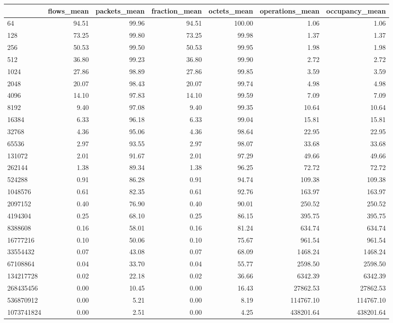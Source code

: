 \begin{tabular}{lrrrrrr}
\toprule
 & flows_mean & packets_mean & fraction_mean & octets_mean & operations_mean & occupancy_mean \\
\midrule
64 & 94.51 & 99.96 & 94.51 & 100.00 & 1.06 & 1.06 \\
128 & 73.25 & 99.80 & 73.25 & 99.98 & 1.37 & 1.37 \\
256 & 50.53 & 99.50 & 50.53 & 99.95 & 1.98 & 1.98 \\
512 & 36.80 & 99.23 & 36.80 & 99.90 & 2.72 & 2.72 \\
1024 & 27.86 & 98.89 & 27.86 & 99.85 & 3.59 & 3.59 \\
2048 & 20.07 & 98.43 & 20.07 & 99.74 & 4.98 & 4.98 \\
4096 & 14.10 & 97.83 & 14.10 & 99.59 & 7.09 & 7.09 \\
8192 & 9.40 & 97.08 & 9.40 & 99.35 & 10.64 & 10.64 \\
16384 & 6.33 & 96.18 & 6.33 & 99.04 & 15.81 & 15.81 \\
32768 & 4.36 & 95.06 & 4.36 & 98.64 & 22.95 & 22.95 \\
65536 & 2.97 & 93.55 & 2.97 & 98.07 & 33.68 & 33.68 \\
131072 & 2.01 & 91.67 & 2.01 & 97.29 & 49.66 & 49.66 \\
262144 & 1.38 & 89.34 & 1.38 & 96.25 & 72.72 & 72.72 \\
524288 & 0.91 & 86.28 & 0.91 & 94.74 & 109.38 & 109.38 \\
1048576 & 0.61 & 82.35 & 0.61 & 92.76 & 163.97 & 163.97 \\
2097152 & 0.40 & 76.90 & 0.40 & 90.01 & 250.52 & 250.52 \\
4194304 & 0.25 & 68.10 & 0.25 & 86.15 & 395.75 & 395.75 \\
8388608 & 0.16 & 58.01 & 0.16 & 81.24 & 634.74 & 634.74 \\
16777216 & 0.10 & 50.06 & 0.10 & 75.67 & 961.54 & 961.54 \\
33554432 & 0.07 & 43.08 & 0.07 & 68.09 & 1468.24 & 1468.24 \\
67108864 & 0.04 & 33.70 & 0.04 & 55.77 & 2598.50 & 2598.50 \\
134217728 & 0.02 & 22.18 & 0.02 & 36.66 & 6342.39 & 6342.39 \\
268435456 & 0.00 & 10.45 & 0.00 & 16.43 & 27862.53 & 27862.53 \\
536870912 & 0.00 & 5.21 & 0.00 & 8.19 & 114767.10 & 114767.10 \\
1073741824 & 0.00 & 2.51 & 0.00 & 4.25 & 438201.64 & 438201.64 \\
\bottomrule
\end{tabular}
